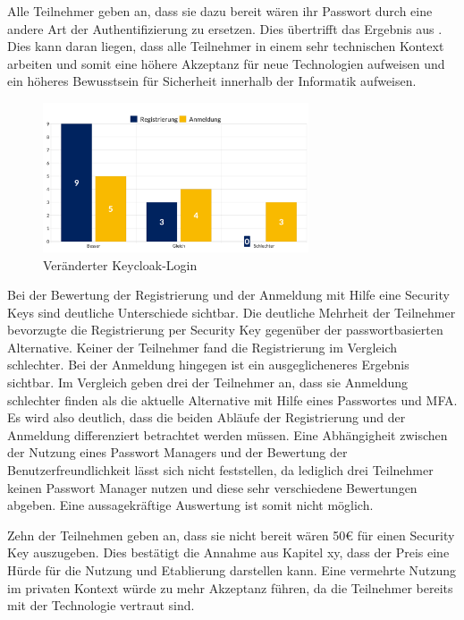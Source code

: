 Alle Teilnehmer geben an, dass sie dazu bereit wären ihr Passwort durch eine andere Art der Authentifizierung zu ersetzen. Dies übertrifft das Ergebnis aus \cite{techstat}. Dies kann daran liegen, dass alle Teilnehmer in einem sehr technischen Kontext arbeiten und somit eine höhere Akzeptanz für neue Technologien aufweisen und ein höheres Bewusstsein für Sicherheit innerhalb der Informatik aufweisen. 

\begin{figure}[H]
	\centering 
	\includegraphics[width=0.7\textwidth]{img/abbildungen/chart_anmeldung_register.png}
	\captionsetup{format=hang}
	\caption{Veränderter Keycloak-Login}
\end{figure}

Bei der Bewertung der Registrierung und der Anmeldung mit Hilfe eine Security Keys sind deutliche Unterschiede sichtbar. Die deutliche Mehrheit der Teilnehmer bevorzugte die Registrierung per Security Key gegenüber der passwortbasierten Alternative. Keiner der Teilnehmer fand die Registrierung im Vergleich schlechter. Bei der Anmeldung hingegen ist ein ausgeglicheneres Ergebnis sichtbar. Im Vergleich geben drei der Teilnehmer an, dass sie Anmeldung schlechter finden als die aktuelle Alternative mit Hilfe eines Passwortes und \ac{MFA}. Es wird also deutlich, dass die beiden Abläufe der Registrierung und der Anmeldung differenziert betrachtet werden müssen. 
Eine Abhängigheit zwischen der Nutzung eines Passwort Managers und der Bewertung der Benutzerfreundlichkeit lässt sich nicht feststellen, da lediglich drei Teilnehmer keinen Passwort Manager nutzen und diese sehr verschiedene Bewertungen abgeben. Eine aussagekräftige Auswertung ist somit nicht möglich. 


Zehn der Teilnehmen geben an, dass sie nicht bereit wären 50€ für einen Security Key auszugeben. Dies bestätigt die Annahme aus Kapitel xy, dass der Preis eine Hürde für die Nutzung und Etablierung darstellen kann. Eine vermehrte Nutzung im privaten Kontext würde zu mehr Akzeptanz führen, da die Teilnehmer bereits mit der Technologie vertraut sind. 

